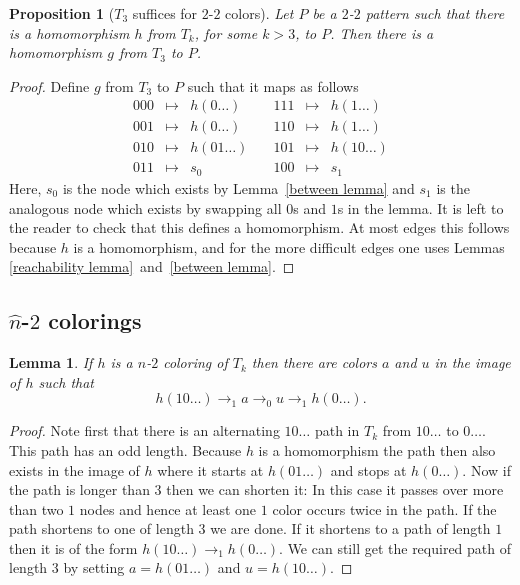\documentclass[a4paper]{article}
\newtheorem{lemma}[theorem]{Lemma}
\newtheorem{proposition}[theorem]{Proposition}
\begin{document}
\begin{proposition}[$T_3$ suffices for $2$-$2$ colors]
 Let $P$ be a $2$-$2$ pattern such that there is a homomorphism $h$ from
$T_k$, for some $k > 3$, to $P$. Then there is a homomorphism $g$ from
$T_3$ to $P$.
\end{proposition}
\begin{proof}
Define $g$ from $T_3$ to $P$ such that it maps as follows
\[
 \begin{array}{rcl}
 000 & \mapsto & h(0\dots) \\
 001 & \mapsto & h(0\dots) \\
 010 & \mapsto & h(01\dots) \\
 011 & \mapsto & s_0
 \end{array} \quad
 \begin{array}{rcl}
 111 & \mapsto & h(1\dots) \\
 110 & \mapsto & h(1\dots) \\
 101 & \mapsto & h(10\dots) \\
 100 & \mapsto & s_1
 \end{array}
\]
Here, $s_0$ is the node which exists by Lemma~\ref{between lemma} and
$s_1$ is the analogous node which exists by swapping all $0$s and $1$s
in the lemma. It is left to the reader to check that this defines a
homomorphism. At most edges this follows because $h$ is a homomorphism,
and for the more difficult edges one uses Lemmas \ref{reachability
lemma}~and~\ref{between lemma}.
\end{proof}

\subsection{$\hat{n}$-$2$ colorings}

\begin{lemma} \label{hat one}
 If $h$ is a $n$-$2$ coloring of $T_k$ then there are colors $a$
and $u$ in the image of $h$ such that
\[
 h(10\dots) \rightarrow_1 a \rightarrow_0 u \rightarrow_1 h(0\dots).
\]
\end{lemma}
\begin{proof}
 Note first that there is an alternating $10 \dots$ path in $T_k$ from
$10\dots$ to $0 \dots$. This path has an odd length. Because $h$ is a
homomorphism the path then also exists in the image of $h$ where it
starts at $h(01\dots)$ and stops at $h(0\dots)$. Now if the path is
longer than $3$ then we can shorten it: In this case it passes over more
than two $1$ nodes and hence at least one $1$ color occurs twice in the
path. If the path shortens to one of length $3$ we are done. If it
shortens to a path of length $1$ then it is of the form $h(10\dots)
\rightarrow_1 h(0\dots)$. We can still get the required path of length
$3$ by setting $a = h(01\dots)$ and $u = h(10\dots)$.
\end{proof}
\end{document}
